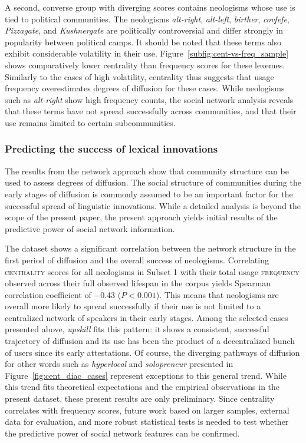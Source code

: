 \documentclass[
  a4paper,
  abstract=on,
  captions=tableabove,
  ]{scrartcl}
\newcommand{\ol}[1]{\emph{#1}}
\begin{document}
      A second, converse group with diverging scores contains neologisms whose use is tied to political communities. The neologisms \ol{alt-right}, \ol{alt-left}, \ol{birther}, \ol{covfefe}, \ol{Pizzagate}, and \ol{Kushnergate} are politically controversial and differ strongly in popularity between political camps. It should be noted that these terms also exhibit considerable volatility in their use. Figure~\ref{subfig:cent-vs-freq_sample} shows comparatively lower centrality than frequency scores for these lexemes. Similarly to the cases of high volatility, centrality thus suggests that usage frequency overestimates degrees of diffusion for these cases. While neologisms such as \ol{alt-right} show high frequency counts, the social network analysis reveals that these terms have not spread successfully across communities, and that their use remains limited to certain subcommunities.

    \subsubsection{Predicting the success of lexical innovations}

      The results from the network approach show that community structure can be used to assess degrees of diffusion. The social structure of communities during the early stages of diffusion is commonly assumed to be an important factor for the successful spread of linguistic innovations. While a detailed analysis is beyond the scope of the present paper, the present approach yields initial results of the predictive power of social network information.

      The dataset shows a significant correlation between the network structure in the first period of diffusion and the overall success of neologisms. Correlating \textsc{centrality} scores for all neologisms in Subset 1 with their total usage \textsc{frequency} observed across their full observed lifespan in the corpus yields Spearman correlation coefficient of \num{-0.43} (${P < 0.001}$). This means that neologisms are overall more likely to spread successfully if their use is not limited to a centralized network of speakers in their early stages. Among the selected cases presented above, \ol{upskill} fits this pattern: it shows a consistent, successful trajectory of diffusion and its use has been the product of a decentralized bunch of users since its early attestations. Of course, the diverging pathways of diffusion for other words such as \ol{hyperlocal} and \ol{solopreneur} presented in Figure~\ref{fig:cent_diac_cases} represent exceptions to this general trend. While this trend fits theoretical expectations and the empirical observations in the present dataset, these present results are only preliminary. Since centrality correlates with frequency scores, future work based on larger samples, external data for evaluation, and more robust statistical tests is needed to test whether the predictive power of social network features can be confirmed.
\end{document}
